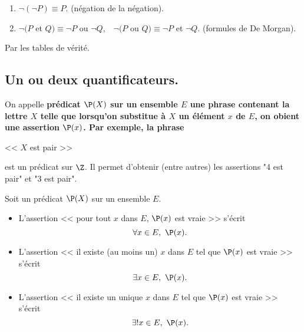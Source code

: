 \documentclass[11pt]{article}
\begin{document}
\begin{prop}{}{}
    \begin{enumerate}[topsep=0pt,itemsep=-0.9 ex]
        \item $\lnot(\lnot P)\equiv P$. (négation de la négation).
        \item $\lnot(P$ et $Q)\equiv\lnot P$ ou $\lnot Q$,$\quad$$\lnot(P$ ou $Q)\equiv\lnot P$ et $\lnot Q$. (formules de De Morgan).
    \end{enumerate}
    \tcblower
    Par les tables de vérité.
\end{prop}

\subsection{Un ou deux quantificateurs.}

On appelle \bf{prédicat} $\P(X)$ sur un ensemble $E$ une phrase contenant la lettre $X$ telle que lorsqu'on substitue à $X$ un élément $x$ de $E$, on obient une assertion $\P(x)$. Par exemple, la phrase
\begin{center}
    << $X$ est pair >>
\end{center}
est un prédicat sur $\Z$. Il permet d'obtenir (entre autres) les assertions "4 est pair" et "3 est pair".
\vspace{0.3cm}

\begin{defi}{}{}
    Soit un prédicat $\P(X)$ sur un ensemble $E$.
    \begin{itemize}[topsep=0pt,itemsep=-0.9 ex]
        \item L'assertion << pour tout $x$ dans $E$, $\P(x)$ est vraie >> s'écrit
        \begin{equation*}
            \forall x \in E, ~ \P(x).
        \end{equation*}
        \item L'assertion << il existe (au moins un) $x$ dans $E$ tel que $\P(x)$ est vraie >> s'écrit
        \begin{equation*}
            \exists x \in E, ~ \P(x).
        \end{equation*}
        \item L'assertion << il existe un unique $x$ dans $E$ tel que $\P(x)$ est vraie >> s'écrit
        \begin{equation*}
            \exists! x \in E, ~ \P(x).
        \end{equation*}
    \end{itemize}
\end{defi}
\end{document}
